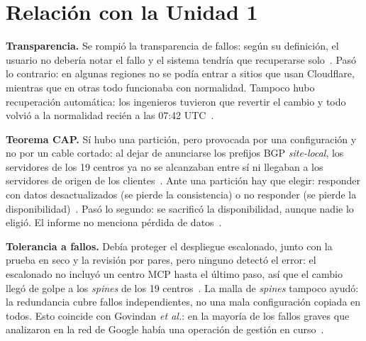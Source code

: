 \section{Relación con la Unidad 1}\label{sec:unidad1}

\textbf{Transparencia.} Se rompió la transparencia de fallos: según su definición, el usuario no debería notar el fallo y el sistema tendría que recuperarse solo~\cite{vansteen2016brief}. Pasó lo contrario: en algunas regiones no se podía entrar a sitios que usan Cloudflare, mientras que en otras todo funcionaba con normalidad. Tampoco hubo recuperación automática: los ingenieros tuvieron que revertir el cambio y todo volvió a la normalidad recién a las 07:42 UTC~\cite{cloudflare2022}.

\textbf{Teorema CAP.} Sí hubo una partición, pero provocada por una configuración y no por un cable cortado: al dejar de anunciarse los prefijos BGP \emph{site-local}, los servidores de los 19 centros ya no se alcanzaban entre sí ni llegaban a los servidores de origen de los clientes~\cite{cloudflare2022}. Ante una partición hay que elegir: responder con datos desactualizados (se pierde la consistencia) o no responder (se pierde la disponibilidad)~\cite{gilbert2002brewer}. Pasó lo segundo: se sacrificó la disponibilidad, aunque nadie lo eligió. El informe no menciona pérdida de datos~\cite{cloudflare2022}.

\textbf{Tolerancia a fallos.} Debía proteger el despliegue escalonado, junto con la prueba en seco y la revisión por pares, pero ninguno detectó el error: el escalonado no incluyó un centro MCP hasta el último paso, así que el cambio llegó de golpe a los \emph{spines} de los 19 centros~\cite{cloudflare2022}. La malla de \emph{spines} tampoco ayudó: la redundancia cubre fallos independientes, no una mala configuración copiada en todos. Esto coincide con Govindan \emph{et al.}: en la mayoría de los fallos graves que analizaron en la red de Google había una operación de gestión en curso~\cite{govindan2016evolve}.
